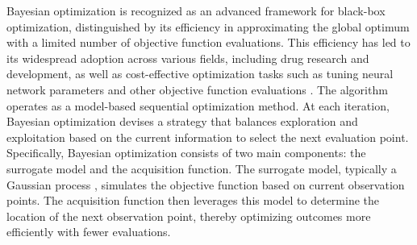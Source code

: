 \documentclass{article}
\begin{document}
\hspace{2em}
Bayesian optimization is recognized as an advanced framework for black-box optimization, distinguished by its efficiency in approximating the global optimum with a limited number of objective function evaluations. This efficiency has led to its widespread adoption across various fields, including drug research and development, as well as cost-effective optimization tasks such as tuning neural network parameters and other objective function evaluations \citep{Shahriari2016taking}. The algorithm operates as a model-based sequential optimization method. At each iteration, Bayesian optimization devises a strategy that balances exploration and exploitation based on the current information to select the next evaluation point. Specifically, Bayesian optimization consists of two main components: the surrogate model and the acquisition function. The surrogate model, typically a Gaussian process \citep{Rasmussen2005Gaussian}, simulates the objective function based on current observation points. The acquisition function then leverages this model to determine the location of the next observation point, thereby optimizing outcomes more efficiently with fewer evaluations.
\end{document}
